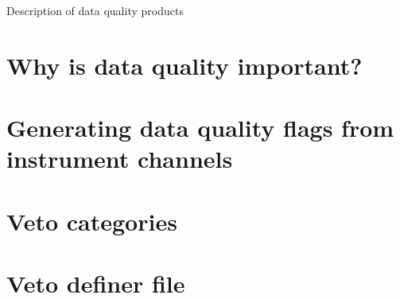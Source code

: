 Description of data quality products

\section{Why is data quality important?}

\section{Generating data quality flags from instrument channels}

\section{Veto categories}

\section{Veto definer file}



